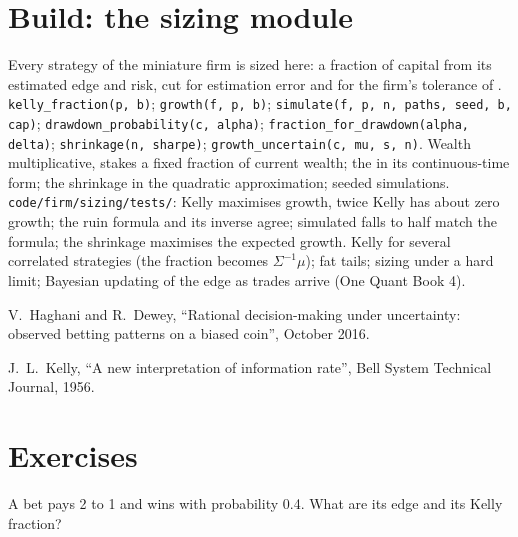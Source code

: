 \section{Build: the sizing module}\label{bld:m2:thinking-in-expected-value:sizing}

\begin{build}
 Every strategy of the miniature firm is sized here: a fraction of
capital from its estimated edge and risk, cut for estimation error and for the firm's
tolerance of .
 \texttt{kelly\_fraction(p, b)}; \texttt{growth(f, p, b)};
\texttt{simulate(f, p, n, paths, seed, b, cap)}; \texttt{drawdown\_probability(c,
alpha)}; \texttt{fraction\_for\_drawdown(alpha, delta)}; \texttt{shrinkage(n, sharpe)};
\texttt{growth\_uncertain(c, mu, s, n)}.
 Wealth multiplicative, stakes a fixed fraction of current wealth; the
 in its continuous-time form; the shrinkage in the quadratic approximation;
seeded simulations.
 \texttt{code/firm/sizing/tests/}: Kelly maximises growth, twice
Kelly has about zero growth; the ruin formula and its inverse agree; simulated falls to
half match the formula; the shrinkage maximises the expected growth.
 Kelly for several correlated strategies (the fraction becomes
$\Sigma^{-1}\mu$); fat tails; sizing under a hard  limit; Bayesian updating of the
edge as trades arrive (One Quant Book 4).
\end{build}

\begin{omsources}
\item V.~Haghani and R.~Dewey, ``Rational decision-making under uncertainty: observed
betting patterns on a biased coin'', October 2016.
\item J.~L.~Kelly, ``A new interpretation of information rate'', Bell System Technical
Journal, 1956.
\end{omsources}

\section{Exercises}

\begin{exercise}[$\star$]\label{exo:m2:thinking-in-expected-value:1}
A bet pays 2 to 1 and wins with probability 0.4. What are its edge and its Kelly fraction?
\end{exercise}

